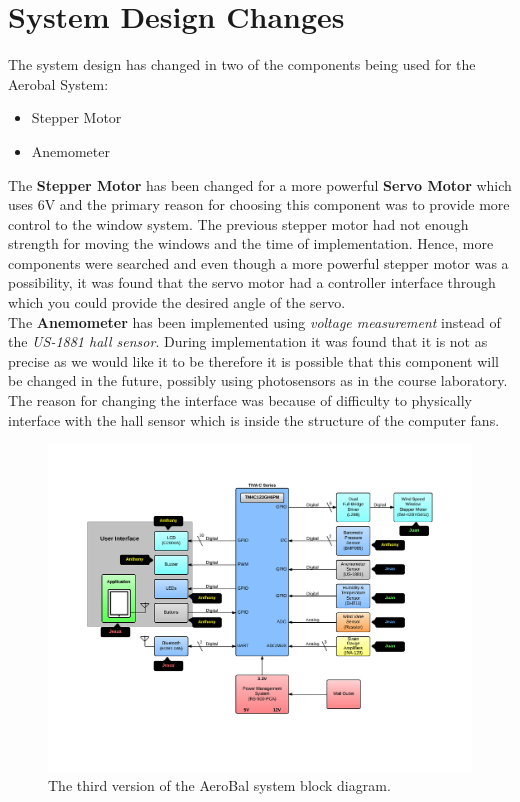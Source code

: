 \section{System Design Changes}

	The system design has changed in two of the components being used for the Aerobal System:

	\begin{itemize}
		\item Stepper Motor
		\item Anemometer
	\end{itemize}

	The \textbf{Stepper Motor} has been changed for a more powerful \textbf{Servo Motor} which uses 6V and the primary reason for choosing this component was to provide more control to the window system. The previous stepper motor had not enough strength for moving the windows and the time of implementation. Hence, more components were searched and even though a more powerful stepper motor was a possibility, it was found that the servo motor had a controller interface through which you could provide the desired angle of the servo.\\


	The \textbf{Anemometer} has been implemented using \emph{voltage measurement} instead of the \emph{US-1881 hall sensor}. During implementation it was found that it is not as precise as we would like it to be therefore it is possible that this component will be changed in the future, possibly using photosensors as in the course laboratory. The reason for changing the interface was because of difficulty to physically interface with the hall sensor which is inside the structure of the computer fans.

	\begin{figure}[H]
		\centering
			\includegraphics[scale=0.22]{img/divisioncomponent}
		\caption{The third version of the AeroBal system block diagram.}
	\end{figure}

\newpage